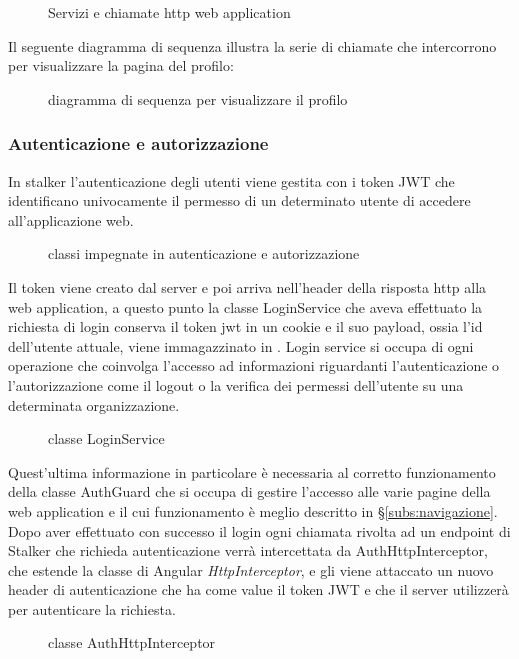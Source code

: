 \documentclass[../../manuale-manutentore.tex]{subfiles}
\begin{document}
\begin{figure}[H]
  \centering
  \caption{Servizi e chiamate http web application}%
  \label{fig:web-app-http-calls}
\end{figure}

Il seguente diagramma di sequenza illustra la serie di chiamate che intercorrono per visualizzare la pagina del profilo:
\begin{figure}[H]
  \centering
  \caption{diagramma di sequenza per visualizzare il profilo}%
  \label{fig:web-app-http-call-sequence}
\end{figure}

\subsubsection{Autenticazione e autorizzazione}%
\label{subs:autenticazione}

In stalker l'autenticazione degli utenti viene gestita con i token JWT che identificano univocamente il permesso di un determinato utente di accedere all'applicazione web.
\begin{figure}[H]
  \centering
  \caption{classi impegnate in autenticazione e autorizzazione}%
  \label{fig:web-app-auth}
\end{figure}
Il token viene creato dal server e poi arriva nell'header della risposta http alla web application, a questo punto la classe LoginService che aveva effettuato la richiesta di login conserva il token jwt in un cookie e il suo payload, ossia l'id dell'utente attuale, viene immagazzinato in .
Login service si occupa di ogni operazione che coinvolga l'accesso ad informazioni riguardanti l'autenticazione o l'autorizzazione come il logout o la verifica dei permessi dell'utente su una determinata organizzazione.
\begin{figure}[H]
  \centering
  \caption{classe LoginService}%
  \label{fig:web-app-loginservice}
\end{figure}
Quest'ultima informazione in particolare è necessaria al corretto funzionamento della classe AuthGuard che si occupa di gestire l'accesso alle varie pagine della web application e il cui funzionamento è meglio descritto in §\ref{subs:navigazione}.
Dopo aver effettuato con successo il login ogni chiamata rivolta ad un endpoint di Stalker che richieda autenticazione verrà intercettata da AuthHttpInterceptor, che estende la classe di Angular \textit{HttpInterceptor}, e gli viene attaccato un nuovo header di autenticazione che ha come value il token JWT e che il server utilizzerà per autenticare la richiesta.
\begin{figure}[H]
  \centering
  \caption{classe AuthHttpInterceptor}%
  \label{fig:web-app-authhttpinterceptor}
\end{figure}
\end{document}
